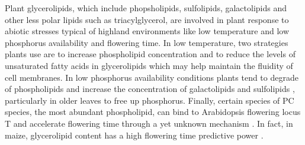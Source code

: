 \documentclass[9pt,twocolumn,twoside]{BioRxiv}
\begin{document}
Plant glycerolipids, which include phopsholipids, sulfolipids, galactolipids and other less polar lipids such as triacylglycerol, are involved in plant response to abiotic stresses typical of highland environments like low temperature and low phosphorus availability and flowering time.
In low temperature, two strategies plants use are to increase phospholipid concentration \cite{Degenkolbe2012-wf} and to reduce the levels of unsaturated fatty acids in glycerolipids \cite{Welti2002-uk, Lynch1987-ln} which may help maintain the fluidity of cell membranes.
In low phosphorus availability conditions plants tend to  degrade of phospholipids and increase the concentration of galactolipids and sulfolipids \cite{Lambers2012-an}, particularly in older leaves to free up phosphorus. 
Finally, certain species of PC species, the most abundant phospholipid, can bind to Arabidopsis flowering locus T and accelerate flowering time through a yet unknown mechanism \cite{Nakamura2014-qf}. 
In fact, in maize, glycerolipid content has a high flowering time predictive power \cite{Riedelsheimer2013-bd}. 
\end{document}
